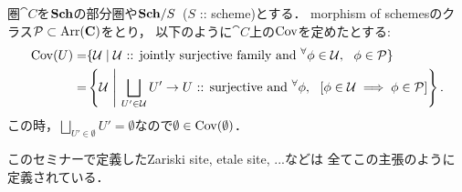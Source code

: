 \documentclass[a4paper, dvipdfmx]{jsarticle}
\begin{document}
\begin{Example}
    圏$\cat{C}$を$\mathbf{Sch}$の部分圏や$\mathbf{Sch}/S$\ ($S$ :: scheme)とする．
    morphism of schemesのクラス$\mathcal{P} \subset \operatorname{Arr}(\mathbf{C})$をとり，
    以下のように$\cat{C}$上の$\operatorname{Cov}$を定めたとする:
    \begin{align*}
        \operatorname{Cov}(U)
        =&\{
            \mathcal{U} \mid
            \mathcal{U} \text{ :: jointly surjective family and }
            {}^{\forall} \phi \in \mathcal{U},~~ \phi \in \mathcal{P}
        \} \\
        =&\left\{
            \mathcal{U} ~\middle|~
            \bigsqcup_{U' \in \mathcal{U}}U' \to U \text{ :: surjective}
            \text{ and }
            {}^{\forall} \phi,~~ \left[ \phi \in \mathcal{U} \implies \phi \in \mathcal{P} \right]
        \right\}.
    \end{align*}
    この時，$\bigsqcup_{U' \in \emptyset}U'=\emptyset$なので$\emptyset \in \operatorname{Cov}(\emptyset)$．

    このセミナーで定義したZariski site, etale site, ...などは
    全てこの主張のように定義されている．
\end{Example}
\end{document}
